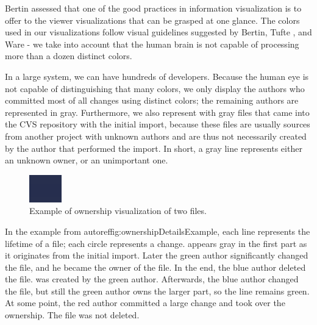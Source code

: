 \documentclass[10pt]{book}
\begin{document}
Bertin \cite{Bert74a} assessed that one of the good practices in information visualization is to offer to the viewer visualizations that can be grasped at one glance. The colors used in our visualizations follow visual guidelines suggested by Bertin, Tufte \cite{Tuft90a}, and Ware \cite{Ware00a} \-- \eg we take into account that the human brain is not capable of processing more than a dozen distinct colors.

In a large system, we can have hundreds of developers. Because the human eye is not capable of distinguishing that many colors, we only display the authors who committed most of all changes using distinct colors; the remaining authors are represented in gray. Furthermore, we also represent with gray files that came into the CVS repository with the initial import, because these files are usually sources from another project with unknown authors and are thus not necessarily created by the author that performed the import. In short, a gray line represents either an unknown owner, or an unimportant one.

\begin{figure}[htb]
\begin{center}
\includegraphics[width=\linewidth]{owners-map-detail}
\caption{Example of ownership visualization of two files.}
\label{fig:ownershipDetailsExample}
\end{center}
\end{figure}

In the example from autoref{fig:ownershipDetailsExample}, each line represents the lifetime of a file; each circle represents a change.  appears gray in the first part as it originates from the initial import. Later the green author significantly changed the file, and he became the owner of the file. In the end, the blue author deleted the file.  was created by the green author. Afterwards, the blue author changed the file, but still the green author owns the larger part, so the line remains green. At some point, the red author committed a large change and took over the ownership. The file was not deleted.
\end{document}
